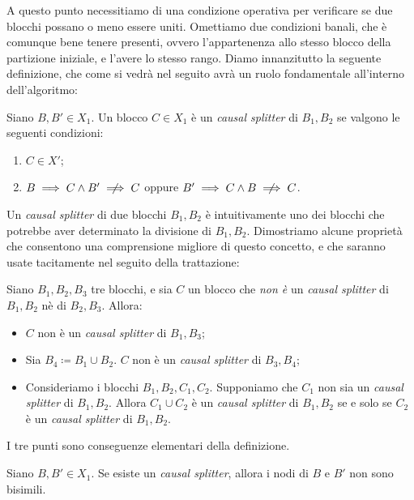 A questo punto necessitiamo di una condizione operativa per verificare se due blocchi possano o meno essere uniti. Omettiamo due condizioni banali, che è comunque bene tenere presenti, ovvero l'appartenenza allo stesso blocco della partizione iniziale, e l'avere lo stesso rango. Diamo innanzitutto la seguente definizione, che come si vedrà nel seguito avrà un ruolo fondamentale all'interno dell'algoritmo:

\begin{definition}
    \label{def:causal_splitter}
    Siano $B,B' \in X_1$. Un blocco $C \in X_1$ è un \emph{causal splitter} di $B_1,B_2$ se valgono le seguenti condizioni:
    \begin{enumerate}
        \item $C \in X'$;
        \item $B \implies C \land B' \centernot\implies C$ oppure $B' \implies C \land B \centernot\implies C$.
    \end{enumerate}
\end{definition}

Un \emph{causal splitter} di due blocchi $B_1,B_2$ è intuitivamente uno dei blocchi che potrebbe aver determinato la divisione di $B_1,B_2$. Dimostriamo alcune proprietà che consentono una comprensione migliore di questo concetto, e che saranno usate tacitamente nel seguito della trattazione:

\begin{observation}
    Siano $B_1, B_2, B_3$ tre blocchi, e sia $C$ un blocco che \emph{non è} un \emph{causal splitter} di $B_1,B_2$ nè di $B_2,B_3$. Allora:
    \begin{itemize}
        \item $C$ non è un \emph{causal splitter} di $B_1,B_3$;
        \item Sia $B_4 \coloneqq B_1 \cup B_2$. $C$ non è un \emph{causal splitter} di $B_3, B_4$;
        \item Consideriamo i blocchi $B_1, B_2, C_1, C_2$. Supponiamo che $C_1$ non sia un \emph{causal splitter} di $B_1,B_2$. Allora $C_1 \cup C_2$ è un \emph{causal splitter} di $B_1,B_2$ se e solo se $C_2$ è un \emph{causal splitter} di $B_1,B_2$.
    \end{itemize}
\end{observation}
\begin{proof2}
    I tre punti sono conseguenze elementari della definizione.
\end{proof2}

\begin{corollary}
    \label{cor:criterio_causal_splitter}
    Siano $B,B' \in X_1$. Se esiste un \emph{causal splitter}, allora i nodi di $B$ e $B'$ non sono bisimili.
\end{corollary}

